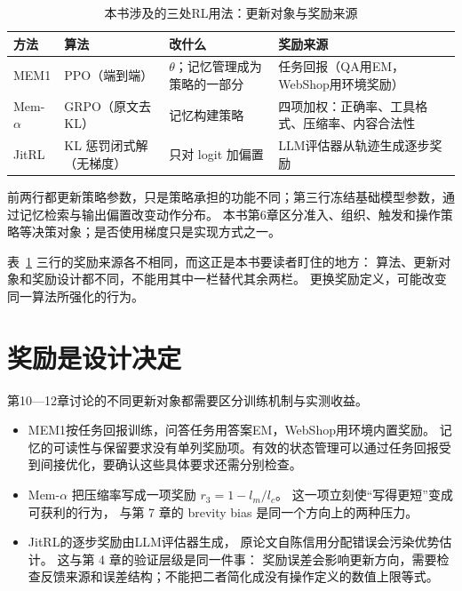\begin{table}[htbp]
\centering
\caption{本书涉及的三处RL用法：更新对象与奖励来源}
\label{tab:appc-rl}
\begin{tabular}{>{\raggedright\arraybackslash}p{2.3cm}>{\raggedright\arraybackslash}p{3.2cm}>{\raggedright\arraybackslash}p{4.1cm}>{\raggedright\arraybackslash}p{3.3cm}}
\toprule
方法 & 算法 & 改什么 & 奖励来源 \\
\midrule
MEM1 & PPO（端到端） & $\theta$；记忆管理成为策略的一部分\cite{mem1-2506} & 任务回报（QA用EM，WebShop用环境奖励）\cite{mem1-2506} \\
Mem-$\alpha$ & GRPO（原文去 KL） & 记忆构建策略\cite{memalpha-2509} & 四项加权：正确率、工具格式、压缩率、内容合法性\cite{memalpha-2509} \\
JitRL & KL 惩罚闭式解（无梯度） & 只对 logit 加偏置\cite{jitrl-2601} & LLM评估器从轨迹生成逐步奖励\cite{jitrl-2601} \\
\bottomrule
\end{tabular}

\vspace{2mm}
\begin{footnotesize}
前两行都更新策略参数，只是策略承担的功能不同；第三行冻结基础模型参数，通过记忆检索与输出偏置改变动作分布。
本书第6章区分准入、组织、触发和操作策略等决策对象；是否使用梯度只是实现方式之一。
\end{footnotesize}
\end{table}

表~\ref{tab:appc-rl} 三行的奖励来源各不相同，而这正是本书要读者盯住的地方：
算法、更新对象和奖励设计都不同，不能用其中一栏替代其余两栏。
更换奖励定义，可能改变同一算法所强化的行为。

\section{奖励是设计决定}
\label{sec:appc-reward}

第10—12章讨论的不同更新对象都需要区分训练机制与实测收益。

\begin{itemize}
  \item MEM1按任务回报训练，问答任务用答案EM，WebShop用环境内置奖励\cite{mem1-2506}。
        记忆的可读性与保留要求没有单列奖励项。有效的状态管理可以通过任务回报受到间接优化，要确认这些具体要求还需分别检查。
  \item Mem-$\alpha$ 把压缩率写成一项奖励 $r_3=1-l_m/l_c$\cite{memalpha-2509}。
        这一项立刻使``写得更短''变成可获利的行为，
        与第 7 章的 brevity bias 是同一个方向上的两种压力。
  \item JitRL的逐步奖励由LLM评估器生成\cite{jitrl-2601}，
        原论文自陈信用分配错误会污染优势估计。
        这与第 4 章的验证层级是同一件事：
        奖励误差会影响更新方向，需要检查反馈来源和误差结构；不能把二者简化成没有操作定义的数值上限等式。
\end{itemize}

